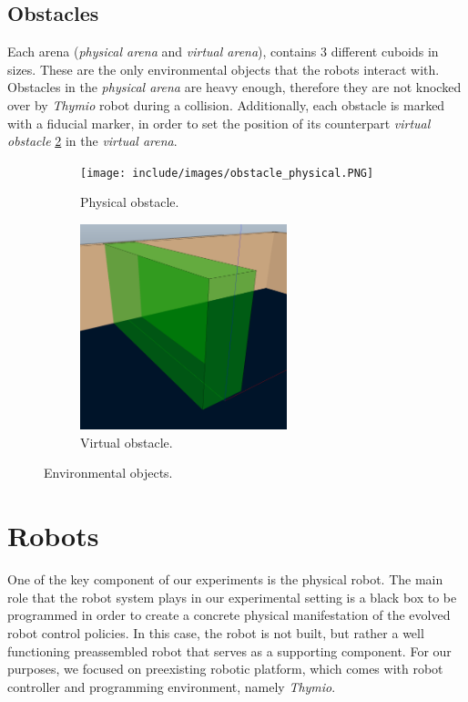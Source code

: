 \subsection{Obstacles}

Each arena (\emph{physical arena} and \emph{virtual arena}), contains 3 different cuboids in sizes. These are the only environmental objects that the robots interact with. Obstacles in the \emph{physical arena} are heavy enough, therefore they are not knocked over by \emph{Thymio} robot during a collision. Additionally, each obstacle is marked with a fiducial marker, in order to set the position of its counterpart \emph{virtual obstacle} \ref{fig:virtual_obstacle} in the \emph{virtual arena}.

\begin{figure}[h]
    \centering
    \begin{subfigure}[b]{0.4\textwidth}
    	\centering
        \texttt{[image: include/images/obstacle\_physical.PNG]}
        \caption{Physical obstacle.}
        \label{fig:physical_obstacle}
    \end{subfigure}
    \begin{subfigure}[b]{0.4\textwidth}
    	\centering
        \includegraphics[width=6cm]{include/images/obstacle_virtual.PNG}
        \caption{Virtual obstacle.}
        \label{fig:virtual_obstacle}
    \end{subfigure}
    \caption{Environmental objects.}\label{sistemass1}
\end{figure}

\section{Robots}

One of the key component of our experiments is the physical robot. The main role that the robot system plays in our experimental setting is a black box to be programmed in order to create a concrete physical manifestation of the evolved robot control policies. In this case, the robot is not built, but rather a well functioning preassembled robot that serves as a supporting component. For our purposes, we focused on preexisting robotic platform, which comes with robot controller and programming environment, namely \emph{Thymio}.

